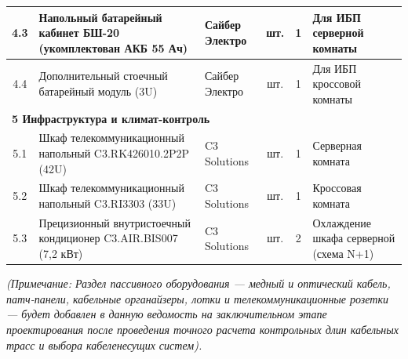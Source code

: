 \documentclass[a4paper,oneside,14pt]{extreport}
\begin{document}
\begin{appendices}
\begin{small}
\begin{longtable}{|c|p{4.6cm}|p{3.1cm}|c|c|p{3.4cm}|}
\hline
4.3 & Напольный батарейный кабинет БШ-20 (укомплектован АКБ 55 Ач) & Сайбер Электро & шт. & 1 & Для ИБП серверной комнаты \\
\hline
4.4 & Дополнительный стоечный батарейный модуль (3U) & Сайбер Электро & шт. & 1 & Для ИБП кроссовой комнаты \\
\hline
\multicolumn{6}{|l|}{\textbf{5 Инфраструктура и климат-контроль}} \\
\hline
5.1 & Шкаф телекоммуникационный напольный C3.RK426010.2P2P (42U) & C3 Solutions & шт. & 1 & Серверная комната \\
\hline
5.2 & Шкаф телекоммуникационный напольный C3.RI3303 (33U) & C3 Solutions & шт. & 1 & Кроссовая комната \\
\hline
5.3 & Прецизионный внутристоечный кондиционер C3.AIR.BIS007 (7,2 кВт) & C3 Solutions & шт. & 2 & Охлаждение шкафа серверной (схема N+1) \\
\hline
\end{longtable}
\end{small}

\textit{(Примечание: Раздел пассивного оборудования --- медный и оптический кабель, патч-панели, кабельные органайзеры, лотки и телекоммуникационные розетки --- будет добавлен в данную ведомость на заключительном этапе проектирования после проведения точного расчета контрольных длин кабельных трасс и выбора кабеленесущих систем).}

\end{appendices}
\end{document}
